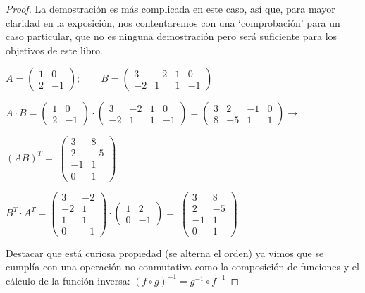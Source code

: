 \begin{proof}

La demostración es más complicada en este caso, así que, para mayor claridad en la exposición, nos contentaremos con una `comprobación' para un caso particular, que no es ninguna demostración pero será suficiente para los objetivos de este libro. 	

$A=\left( \begin{matrix} 1&0 \\ 2&-1   \end{matrix}\right); \qquad B=\left( \begin{matrix} 3&-2&1&0 \\-2&1&1&-1  \end{matrix}\right)$


$A\cdot B=\left( \begin{matrix} 1&0 \\ 2&-1  \end{matrix}\right) \cdot  \left( \begin{matrix} 3&-2&1&0\\-2&1&1&-1  \end{matrix}\right) = \left( \begin{matrix} 3&2&-1&0\\8&-5&1&1 \end{matrix}\right) \to$

$ (AB)^T=\; \left( \begin{matrix} 3&8\\2&-5\\-1&1\\0&1 \end{matrix}\right)\; $

$B^T\cdot A^T=\left( \begin{matrix} 3&-2\\-2&1\\1&1\\0&-1 \end{matrix}\right) 
\cdot \left( \begin{matrix} 1&2\\0&-1  \end{matrix}\right)=
\; \left( \begin{matrix}   3&8\\2&-5\\-1&1\\0&1 \end{matrix}\right)\; $


Destacar que está curiosa propiedad (se alterna el orden) ya vimos que se cumplía con una operación no-conmutativa como la composición de funciones y el cálculo de la función inversa: $(f \circ g)^{-1}= g^{-1} \circ f^{-1}$

\end{proof}
